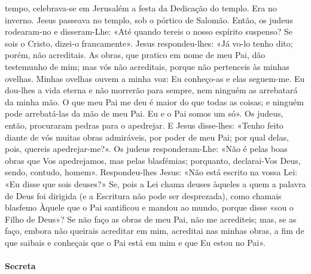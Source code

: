 \begin{paracol}{2}
{ tempo, celebrava-se em Jerusalém a festa da Dedicação do templo. Era no inverno. Jesus passeava no templo, sob o pórtico de Salomão. Então, os judeus rodearam-no e disseram-Lhe: «Até quando tereis o nosso espírito suspenso? Se sois o Cristo, dizei-o francamente». Jesus respondeu-lhes: «Já vo-lo tenho dito; porém, não acreditais. As obras, que pratico em nome de meu Pai, dão testemunho de mim; mas vós não acreditais, porque não pertenceis às minhas ovelhas. Minhas ovelhas ouvem a minha voz: Eu conheço-as e elas seguem-me. Eu dou-lhes a vida eterna e não morrerão para sempre, nem ninguém as arrebatará da minha mão. O que meu Pai me deu é maior do que todas as coisas; e ninguém pode arrebatá-las da mão de meu Pai. Eu e o Pai somos um só». Os judeus, então, procuraram pedras para o apedrejar. E Jesus disse-lhes: «Tenho feito diante de vós muitas obras admiráveis, por poder de meu Pai; por qual delas, pois, quereis apedrejar-me?». Os judeus responderam-Lhe: «Não é pelas boas obras que Vos apedrejamos, mas pelas blasfémias; porquanto, declarai-Vos Deus, sendo, contudo, homem». Respondeu-lhes Jesus: «Não está escrito na vossa Lei: «Eu disse que sois deuses?» Se, pois a Lei chama deuses àqueles a quem a palavra de Deus foi dirigida (e a Escritura não pode ser desprezada), como chamais blasfemo Àquele que o Pai santificou e mandou ao mundo, porque disse «sou o Filho de Deus»? Se não faço as obras de meu Pai, não me acrediteis; mas, se as faço, embora não queirais acreditar em mim, acreditai nas minhas obras, a fim de que saibais e conheçais que o Pai está em mim e que Eu estou no Pai».
}\end{paracol}

\begin{paracol}{2}\switchcolumn{}\end{paracol}

\paragraph{Secreta}
\begin{paracol}{2}\switchcolumn{}\end{paracol}

